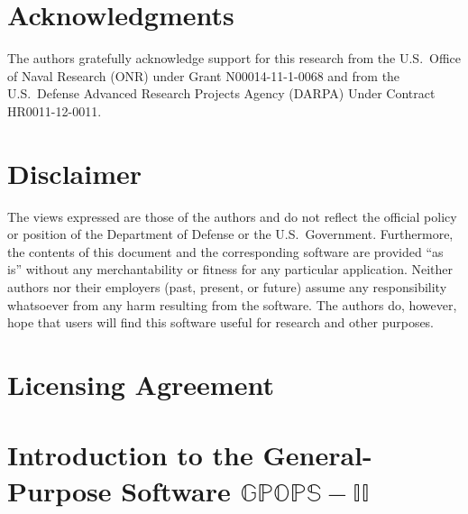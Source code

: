 \documentclass[10pt]{article}
\begin{document}
\section*{Acknowledgments}

The authors gratefully acknowledge support for this research from the 
U.S.~Office of Naval Research (ONR) under Grant N00014-11-1-0068 and 
from the U.S.~Defense Advanced Research Projects Agency (DARPA) Under 
Contract HR0011-12-0011.

\section*{Disclaimer}

The views expressed are those of the authors and do not reflect the
official policy or position of the Department of Defense or the
U.S.~Government.   Furthermore, the contents of this document and the 
corresponding software are provided ``as is'' without any
merchantability or fitness for any particular application.  Neither
authors nor their employers (past, present, or future) assume any
responsibility whatsoever from any harm resulting from the
software. The authors do, however, hope that users will find this
software useful for research and other purposes.   

\section*{Licensing Agreement}



\clearpage
\setcounter{tocdepth}{2}
\tableofcontents

\clearpage

\section{Introduction to the General-Purpose Software $\mathbb{GPOPS-II}$}
\end{document}
